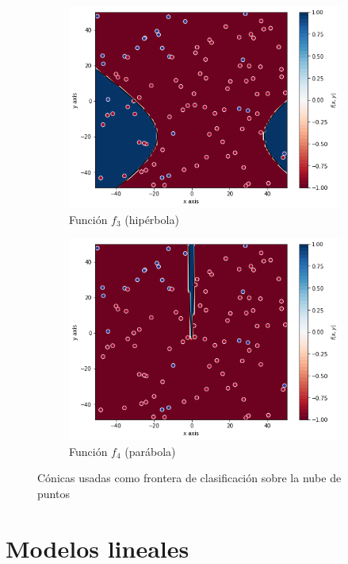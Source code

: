 \documentclass[10pt,a4paper]{article}
\begin{document}
\begin{figure}[h]
\begin{subfigure}{0.5\textwidth}
		\includegraphics[width=\textwidth]{ej1.2_nube_f3}
		\caption{Función $f_3$ (hipérbola)}
	\end{subfigure}
	\begin{subfigure}{0.5\textwidth}
		\centering
		\includegraphics[width=\textwidth]{ej1.2_nube_f4}
		\caption{Función $f_4$ (parábola)}
	\end{subfigure}
	\caption{Cónicas usadas como frontera de clasificación sobre la nube de puntos}
	\label{fig:ej1.2_nubes_conicas}
\end{figure}



\newpage

\section{Modelos lineales}
\end{document}
